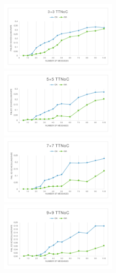 \documentclass[10pt,journal]{IEEEtran}
\theoremstyle{remark}
\begin{document}
\begin{figure}[!t]
	\newcommand{\wid}{2.3}
	\centering
	{\includegraphics[width=\wid in]{picture/33TTNOC}}
	{\includegraphics[width=\wid in]{picture/55TTNOC}}
	{\includegraphics[width=\wid in]{picture/77TTNOC}}	
	{\includegraphics[width=\wid in]{picture/99TTNOC}}

\end{figure}
\end{document}
